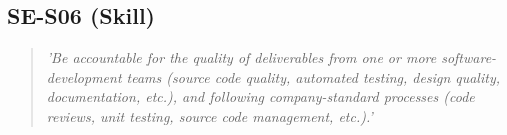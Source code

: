 \subsection{SE-S06 (Skill)}

  \begin{quote}
    \textit{'Be accountable for the quality of deliverables
    from one or more software-development teams (source
    code quality, automated testing, design quality,
    documentation, etc.), and following company-standard
    processes (code reviews, unit testing, source code
    management, etc.).'}
  \end{quote}

\newpage